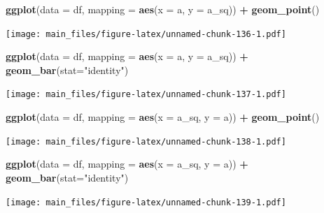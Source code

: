\documentclass[
]{book}
\newenvironment{Shaded}{\begin{snugshade}}{\end{snugshade}}
\newcommand{\AttributeTok}[1]{\textcolor[rgb]{0.13,0.29,0.53}{#1}}
\newcommand{\FunctionTok}[1]{\textcolor[rgb]{0.13,0.29,0.53}{\textbf{#1}}}
\newcommand{\NormalTok}[1]{#1}
\newcommand{\SpecialCharTok}[1]{\textcolor[rgb]{0.81,0.36,0.00}{\textbf{#1}}}
\newcommand{\StringTok}[1]{\textcolor[rgb]{0.31,0.60,0.02}{#1}}
\begin{document}
\begin{Shaded}
\begin{Highlighting}[]
\FunctionTok{ggplot}\NormalTok{(}\AttributeTok{data =}\NormalTok{ df, }\AttributeTok{mapping =} \FunctionTok{aes}\NormalTok{(}\AttributeTok{x =}\NormalTok{ a, }\AttributeTok{y =}\NormalTok{ a\_sq)) }\SpecialCharTok{+} \FunctionTok{geom\_point}\NormalTok{()}
\end{Highlighting}
\end{Shaded}

\texttt{[image: main\_files/figure-latex/unnamed-chunk-136-1.pdf]}

\begin{Shaded}
\begin{Highlighting}[]
\FunctionTok{ggplot}\NormalTok{(}\AttributeTok{data =}\NormalTok{ df, }\AttributeTok{mapping =} \FunctionTok{aes}\NormalTok{(}\AttributeTok{x =}\NormalTok{ a, }\AttributeTok{y =}\NormalTok{ a\_sq)) }\SpecialCharTok{+} \FunctionTok{geom\_bar}\NormalTok{(}\AttributeTok{stat=}\StringTok{"identity"}\NormalTok{)}
\end{Highlighting}
\end{Shaded}

\texttt{[image: main\_files/figure-latex/unnamed-chunk-137-1.pdf]}

\begin{Shaded}
\begin{Highlighting}[]
\FunctionTok{ggplot}\NormalTok{(}\AttributeTok{data =}\NormalTok{ df, }\AttributeTok{mapping =} \FunctionTok{aes}\NormalTok{(}\AttributeTok{x =}\NormalTok{ a\_sq, }\AttributeTok{y =}\NormalTok{ a)) }\SpecialCharTok{+} \FunctionTok{geom\_point}\NormalTok{()}
\end{Highlighting}
\end{Shaded}

\texttt{[image: main\_files/figure-latex/unnamed-chunk-138-1.pdf]}

\begin{Shaded}
\begin{Highlighting}[]
\FunctionTok{ggplot}\NormalTok{(}\AttributeTok{data =}\NormalTok{ df, }\AttributeTok{mapping =} \FunctionTok{aes}\NormalTok{(}\AttributeTok{x =}\NormalTok{ a\_sq, }\AttributeTok{y =}\NormalTok{ a)) }\SpecialCharTok{+} \FunctionTok{geom\_bar}\NormalTok{(}\AttributeTok{stat=}\StringTok{"identity"}\NormalTok{)}
\end{Highlighting}
\end{Shaded}

\texttt{[image: main\_files/figure-latex/unnamed-chunk-139-1.pdf]}
\end{document}
